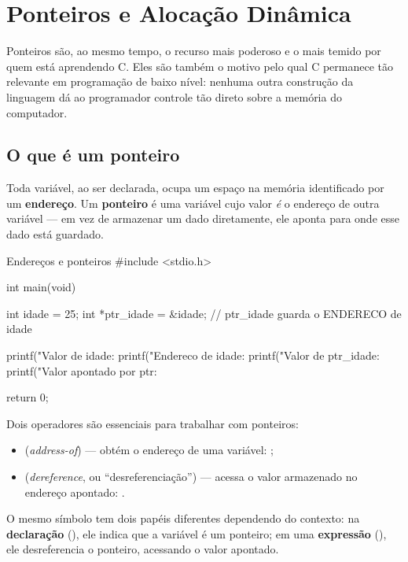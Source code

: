 \chapter{Ponteiros e Alocação Dinâmica}
\label{cap:ponteiros}

Ponteiros são, ao mesmo tempo, o recurso mais poderoso e o mais temido por quem está aprendendo C. Eles são também o motivo pelo qual C permanece tão relevante em programação de baixo nível: nenhuma outra construção da linguagem dá ao programador controle tão direto sobre a memória do computador.

\section{O que é um ponteiro}

Toda variável, ao ser declarada, ocupa um espaço na memória identificado por um \textbf{endereço}. Um \textbf{ponteiro} é uma variável cujo valor \emph{é} o endereço de outra variável — em vez de armazenar um dado diretamente, ele aponta para onde esse dado está guardado.

\begin{codigoc}{Endereços e ponteiros}
#include <stdio.h>

int main(void) {
    int idade = 25;
    int *ptr_idade = &idade;   // ptr_idade guarda o ENDERECO de idade

    printf("Valor de idade:        %
    printf("Endereco de idade:     %
    printf("Valor de ptr_idade:    %
    printf("Valor apontado por ptr: %

    return 0;
}
\end{codigoc}

Dois operadores são essenciais para trabalhar com ponteiros:

\begin{itemize}
    \item \code{\&} (\emph{address-of}) — obtém o endereço de uma variável: ;
    \item \code{*} (\emph{dereference}, ou ``desreferenciação'') — acessa o valor armazenado no endereço apontado: .
\end{itemize}

\begin{nota}
O mesmo símbolo \code{*} tem dois papéis diferentes dependendo do contexto: na \textbf{declaração} (), ele indica que a variável é um ponteiro; em uma \textbf{expressão} (), ele desreferencia o ponteiro, acessando o valor apontado.
\end{nota}

